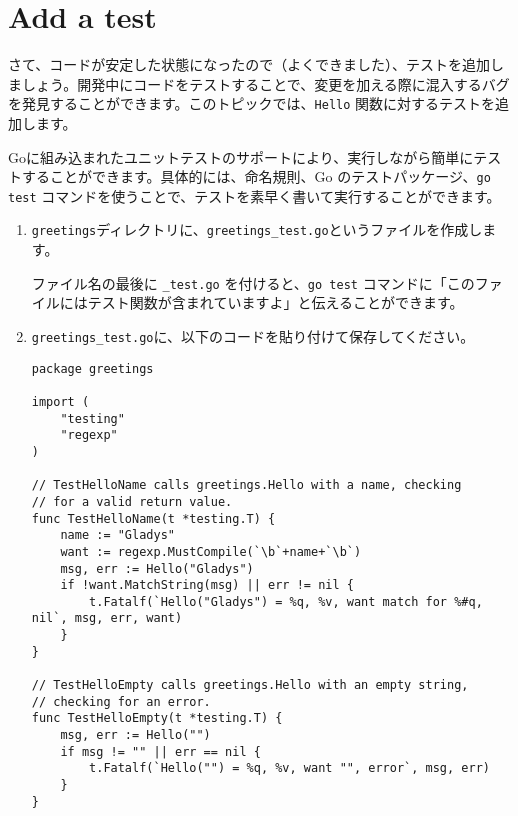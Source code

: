 \section{Add a test}

さて、コードが安定した状態になったので（よくできました）、テストを追加しましょう。開発中にコードをテストすることで、変更を加える際に混入するバグを発見することができます。このトピックでは、\texttt{Hello} 関数に対するテストを追加します。

Goに組み込まれたユニットテストのサポートにより、実行しながら簡単にテストすることができます。具体的には、命名規則、Go のテストパッケージ、\texttt{go test} コマンドを使うことで、テストを素早く書いて実行することができます。




\begin{enumerate}
\item \texttt{greetings}ディレクトリに、\texttt{greetings\_test.go}というファイルを作成します。

ファイル名の最後に \texttt{\_test.go} を付けると、\texttt{go test} コマンドに「このファイルにはテスト関数が含まれていますよ」と伝えることができます。

\item \texttt{greetings\_test.go}に、以下のコードを貼り付けて保存してください。

\begin{lstlisting}[numbers=none]
package greetings

import (
    "testing"
    "regexp"
)

// TestHelloName calls greetings.Hello with a name, checking
// for a valid return value.
func TestHelloName(t *testing.T) {
    name := "Gladys"
    want := regexp.MustCompile(`\b`+name+`\b`)
    msg, err := Hello("Gladys")
    if !want.MatchString(msg) || err != nil {
        t.Fatalf(`Hello("Gladys") = %q, %v, want match for %#q, nil`, msg, err, want)
    }
}

// TestHelloEmpty calls greetings.Hello with an empty string,
// checking for an error.
func TestHelloEmpty(t *testing.T) {
    msg, err := Hello("")
    if msg != "" || err == nil {
        t.Fatalf(`Hello("") = %q, %v, want "", error`, msg, err)
    }
}
\end{lstlisting}


\end{enumerate}
